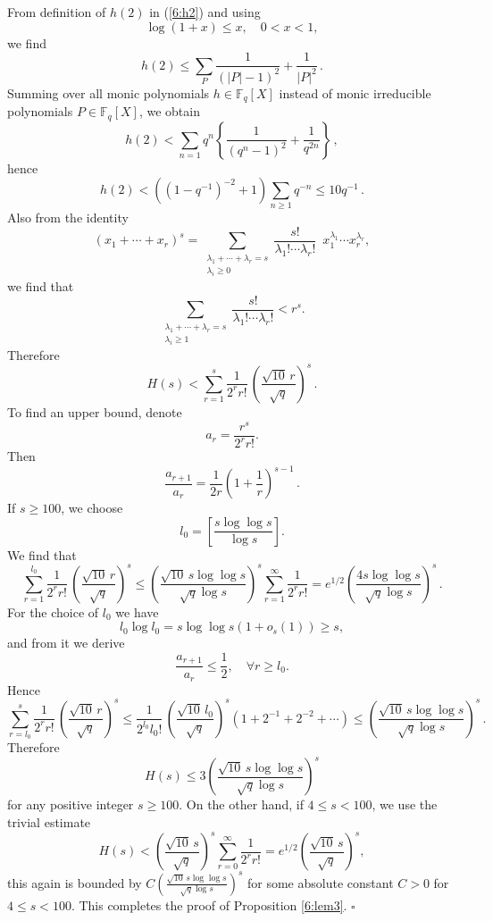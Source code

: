 \documentclass[12pt]{amsart}
\theoremstyle{plain}
\newcommand{\F}{{\mathbb F}_q}
\begin{document}
From definition of $h(2)$ in (\ref{6:h2}) and using
\[\log (1+x) \le x,\quad 0<x<1,\]
we find
\[h(2) \le \sum_{P} \frac{1}{\left(|P|-1\right)^2}+\frac{1}{|P|^2}\,. \]
Summing over all monic polynomials $h \in \F[X]$ instead of monic irreducible polynomials $P \in \F[X]$, we obtain
\[h(2)< \sum_{n=1}q^n \left\{\frac{1}{\left(q^n-1\right)^2}+\frac{1}{q^{2n}}\right\}\,,\]
hence
\[h(2)<\left(\left(1-q^{-1}\right)^{-2}+1\right)\sum_{n \ge 1}q^{-n} \le 10 q^{-1}\,.\]
Also from the identity
\[\left(x_1+\cdots+x_r\right)^s=
\sum_{\substack{\lambda_1+\cdots+\lambda_r=s\\ \lambda_i \ge 0}}
\frac{s!}{\lambda_1! \cdots \lambda_r!}\,\,\,x_1^{\lambda_1} \cdots x_r^{\lambda_r},\]
we find that
\[\sum_{\substack{\lambda_1+\cdots+\lambda_r=s\\ \lambda_i \ge 1}}
\frac{s!}{\lambda_1! \cdots \lambda_r!} < r^s. \]
Therefore
\[H(s)<\sum_{r=1}^s \frac{1}{2^r r!}\, \left(\frac{\sqrt{10}\,r}{\sqrt{q}}\right)^s\,.\]
To find an upper bound, denote
\[a_r=\frac{r^s}{2^r r!}.\]
Then
\[\frac{a_{r+1}}{a_r}=\frac{1}{2r} \left(1+\frac{1}{r}\right)^{s-1}\,.\]
If $s \ge 100$, we choose
\[l_0=\left[\frac{s \log \log s}{\log s}\right].\]
We find that
\[\sum_{r=1}^{l_0}\frac{1}{2^r r!}\, \left(\frac{\sqrt{10}\,r}{\sqrt{q}}\right)^s \le \left(\frac{\sqrt{10}\,s \log \log s}{\sqrt{q}\log s}\right)^s \sum_{r=1}^{\infty}\frac{1}{2^r r!} =e^{1/2}\left(\frac{4s \log \log s}{\sqrt{q}\log s}\right)^s\,. \]
For the choice of $l_0$ we have
\[l_0 \log l_0 =s \log \log s \left(1+o_s(1)\right) \ge s,\]
and from it we derive
\[\frac{a_{r+1}}{a_r} \le \frac{1}{2}, \quad \forall r \ge l_0. \]
Hence
\[\sum_{r=l_0}^{s}\frac{1}{2^r r!}\, \left(\frac{\sqrt{10}\,r}{\sqrt{q}}\right)^s \le \frac{1}{2^{l_0} {l_0}!}\, \left(\frac{\sqrt{10}\,l_0}{\sqrt{q}}\right)^s\left(1+2^{-1}+2^{-2}+\cdots\right) \le \left(\frac{\sqrt{10}\,s \log \log s}{\sqrt{q}\log s}\right)^s\,. \]
Therefore
\[H(s) \le 3 \left(\frac{\sqrt{10}\,s \log \log s}{\sqrt{q}\log s}\right)^s\]
for any positive integer $s \ge 100$. On the other hand, if $4 \le s <100$, we use the trivial estimate
\[H(s)<\left(\frac{\sqrt{10}\,s}{\sqrt{q}}\right)^s
\sum_{r=0}^{\infty}\frac{1}{2^r r!}=e^{1/2}\left(\frac{\sqrt{10}\,s}{\sqrt{q}}\right)^s,\]
this again is bounded by $C \left(\frac{\sqrt{10}\,s \log \log s}{\sqrt{q}\log s}\right)^s$ for some absolute constant $C>0$ for $4 \le s <100$. This completes the proof of Proposition \ref{6:lem3}. \quad $\square$
\end{document}
